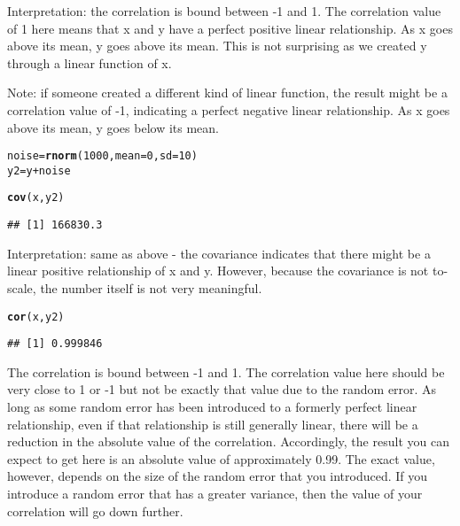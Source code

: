 \documentclass[12pt,letter]{article}\usepackage[]{graphicx}\usepackage[]{color}
\makeatletter
\newcommand{\hlnum}[1]{\textcolor[rgb]{0.686,0.059,0.569}{#1}}%
\newcommand{\hlopt}[1]{\textcolor[rgb]{0,0,0}{#1}}%
\newcommand{\hlstd}[1]{\textcolor[rgb]{0.345,0.345,0.345}{#1}}%
\newcommand{\hlkwb}[1]{\textcolor[rgb]{0.69,0.353,0.396}{#1}}%
\newcommand{\hlkwc}[1]{\textcolor[rgb]{0.333,0.667,0.333}{#1}}%
\newcommand{\hlkwd}[1]{\textcolor[rgb]{0.737,0.353,0.396}{\textbf{#1}}}%
\newenvironment{kframe}{%
 \def\at@end@of@kframe{}%
 \ifinner\ifhmode%
  \def\at@end@of@kframe{\end{minipage}}%
  \begin{minipage}{\columnwidth}%
 \fi\fi%
 \def\FrameCommand##1{\hskip\@totalleftmargin \hskip-\fboxsep
 \colorbox{shadecolor}{##1}\hskip-\fboxsep
     \hskip-\linewidth \hskip-\@totalleftmargin \hskip\columnwidth}%
 \MakeFramed {\advance\hsize-\width
   \@totalleftmargin\z@ \linewidth\hsize
   \@setminipage}}%
 {\par\unskip\endMakeFramed%
 \at@end@of@kframe}
\newenvironment{knitrout}{}{} %
\makeatother
\begin{document}
Interpretation: the correlation is bound between -1 and 1. The correlation value of 1 here means that x and y have a perfect positive linear relationship. As x goes above its mean, y goes above its mean. This is not surprising as we created y through a linear function of x.

Note: if someone created a different kind of linear function, the result might be a correlation value of -1, indicating a perfect negative linear relationship. As x goes above its mean, y goes below its mean.

\begin{knitrout}
\color{fgcolor}\begin{kframe}
\begin{alltt}
\hlstd{noise} \hlkwb{=} \hlkwd{rnorm}\hlstd{(}\hlnum{1000}\hlstd{,} \hlkwc{mean} \hlstd{=} \hlnum{0}\hlstd{,} \hlkwc{sd} \hlstd{=} \hlnum{10}\hlstd{)}
\hlstd{y2} \hlkwb{=} \hlstd{y} \hlopt{+} \hlstd{noise}

\hlkwd{cov}\hlstd{(x, y2)}
\end{alltt}
\begin{verbatim}
## [1] 166830.3
\end{verbatim}
\end{kframe}
\end{knitrout}

Interpretation: same as above - the covariance indicates that there might be a linear positive relationship of x and y. However, because the covariance is not to-scale, the number itself is not very meaningful.

\begin{knitrout}
\color{fgcolor}\begin{kframe}
\begin{alltt}
\hlkwd{cor}\hlstd{(x, y2)}
\end{alltt}
\begin{verbatim}
## [1] 0.999846
\end{verbatim}
\end{kframe}
\end{knitrout}

The correlation is bound between -1 and 1. The correlation value here should be very close to 1 or -1 but not be exactly that value due to the random error. As long as some random error has been introduced to a formerly perfect linear relationship, even if that relationship is still generally linear, there will be a reduction in the absolute value of the correlation. Accordingly, the result you can expect to get here is an absolute value of approximately 0.99. The exact value, however, depends on the size of the random error that you introduced. If you introduce a random error that has a greater variance, then the value of your correlation will go down further.
\end{document}
